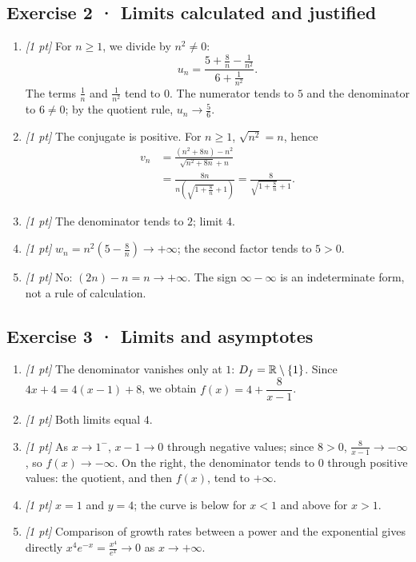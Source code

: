\subsection*{Exercise 2 · Limits calculated and justified}\begin{enumerate}

\item \textit{[1 pt]} For $n\ge1$, we divide by $n^2\ne0$:
\[u_n=\frac{5+\frac{8}{n}-\frac{1}{n^2}}{6+\frac{1}{n^2}}.\]
The terms $\frac{1}{n}$ and $\frac{1}{n^2}$ tend to $0$. The numerator tends to $5$ and the denominator to $6\ne0$; by the quotient rule, $u_n\to\frac{5}{6}$.

\item \textit{[1 pt]} The conjugate is positive. For $n\ge1$, $\sqrt{n^2}=n$, hence
\[\begin{aligned}v_n&=\frac{(n^2+8n)-n^2}{\sqrt{n^2+8n}+n}\\&=\frac{8n}{n(\sqrt{1+\frac{8}{n}}+1)}=\frac{8}{\sqrt{1+\frac{8}{n}}+1}.\end{aligned}\]

\item \textit{[1 pt]} The denominator tends to $2$; limit $4$.

\item \textit{[1 pt]} $w_n=n^2(5-\frac{8}{n})\to+\infty$; the second factor tends to $5>0$.

\item \textit{[1 pt]} No: $(2n)-n=n\to+\infty$. The sign $\infty-\infty$ is an indeterminate form, not a rule of calculation.

\end{enumerate}

\subsection*{Exercise 3 · Limits and asymptotes}\begin{enumerate}

\item \textit{[1 pt]} The denominator vanishes only at $1$: $D_f=\mathbb R\setminus\{1\}$. Since $4x+4=4(x-1)+8$, we obtain $f(x)=4+\dfrac{8}{x-1}$.

\item \textit{[1 pt]} Both limits equal $4$.

\item \textit{[1 pt]} As $x\to 1^-$, $x-1\to0$ through negative values; since $8>0$, $\frac{8}{x-1}\to-\infty$, so $f(x)\to-\infty$. On the right, the denominator tends to $0$ through positive values: the quotient, and then $f(x)$, tend to $+\infty$.

\item \textit{[1 pt]} $x=1$ and $y=4$; the curve is below for $x<1$ and above for $x>1$.

\item \textit{[1 pt]} Comparison of growth rates between a power and the exponential gives directly $x^4e^{-x}=\frac{x^4}{e^x}\to0$ as $x\to+\infty$.

\end{enumerate}

